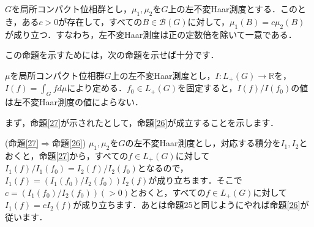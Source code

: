 \begin{yprop}\label{26}
$G$を局所コンパクト位相群とし，$\mu_1, \mu_2$を$G$上の左不変Haar測度とする．このとき，ある$c>0$が存在して，すべての$B \in \mathscr{B}(G)$に対して，$\mu_1(B)=c\mu_2(B)$が成り立つ．すなわち，左不変Haar測度は正の定数倍を除いて一意である．
\end{yprop}
この命題を示すためには，次の命題を示せば十分です．
\begin{yprop}\label{27}
$\mu$を局所コンパクト位相群$G$上の左不変Haar測度とし，$I \colon L_{+}(G) \to \mathbb{R}$を，$I(f)=\int_{G}f d\mu$により定める．$f_0 \in L_{+}(G)$を固定すると，$I(f)/I(f_0)$の値は左不変Haar測度の値によらない．
\end{yprop}
まず，命題\ref{27}が示されたとして，命題\ref{26}が成立することを示します．
\begin{Proof}(命題\ref{27}$\Rightarrow$命題\ref{26}) $\mu_1, \mu_2$を$G$の左不変Haar測度とし，対応する積分を$I_1, I_2$とおくと，命題\ref{27}から，すべての$f \in L_{+}(G)$に対して$I_{1}(f)/I_{1}(f_0)=I_{2}(f)/I_{2}(f_0)$となるので，$I_{1}(f)= \left( I_{1}(f_0)/I_{2}(f_{0}) \right) I_{2}(f)$が成り立ちます．そこで$c=\left( I_{1}(f_0)/I_{2}(f_{0}) \right)(>0)$とおくと，すべての$f \in L_{+}(G)$に対して$I_{1}(f)= c I_{2}(f)$が成り立ちます．あとは命題25と同じようにやれば命題\ref{26}が従います．
\end{Proof}

